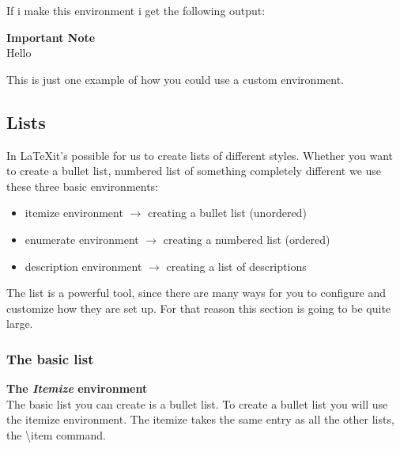\documentclass{article}
\newenvironment{highlightbox}[1] %
{
    \begin{mdframed}[backgroundcolor=yellow!30, linecolor=orange]
    \textbf{#1} \\
}
{
    \end{mdframed}
}
\newcommand{\jbs}[1]{\textbackslash{}#1} %
\begin{document}
If i make this environment i get the following output:

\begin{highlightbox}{Important Note}
    Hello
\end{highlightbox}

This is just one example of how you could use a custom environment.

\subsection{Lists}

In \LaTeX it's possible for us to create lists of different styles. Whether you want to create a bullet list, numbered list of something completely different 
we use these three basic environments:

\begin{itemize}
    \item itemize environment $\rightarrow$ creating a bullet list (unordered)
    \item enumerate environment $\rightarrow$ creating a numbered list (ordered)
    \item description environment $\rightarrow$ creating a list of descriptions 
\end{itemize}

The list is a powerful tool, since there are many ways for you to configure and customize how they are
set up. For that reason this section is going to be quite large. 

\subsubsection{The basic list}
\textbf{The \textit{Itemize} environment} \\
The basic list you can create is a bullet list. To create a bullet list you will use the itemize environment.
The itemize takes the same entry as all the other lists, the \jbs{item} command.
\end{document}
